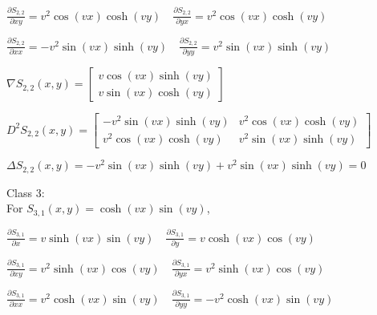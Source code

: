 \documentclass[12pt, executivepaper]{article}
\begin{document}
\begin{flushleft}
\vspace{3mm}

$\frac{\partial S_{2,2}}{\partial xy}=v^2\cos(vx)\cosh(vy) \quad \frac{\partial S_{2,2}}{\partial yx}=v^2\cos(vx)\cosh(vy)$ \\

\vspace{3mm}

$\frac{\partial S_{2,2}}{\partial xx}=-v^2\sin(vx)\sinh(vy) \quad \frac{\partial S_{2,2}}{\partial yy}=v^2\sin(vx)\sinh(vy)$ \\

\vspace{3mm}

$\nabla S_{2,2}(x,y)=
\begin{bmatrix}
v\cos(vx)\sinh(vy) \\
v\sin(vx)\cosh(vy)
\end{bmatrix}$

\vspace{3mm}

$D^2 S_{2,2}(x,y)=
\begin{bmatrix}
-v^2\sin(vx)\sinh(vy) & v^2\cos(vx)\cosh(vy) \\
v^2\cos(vx)\cosh(vy) & v^2\sin(vx)\sinh(vy)
\end{bmatrix}$

\vspace{3mm}

$\Delta S_{2,2}(x,y)=-v^2\sin(vx)\sinh(vy)+v^2\sin(vx)\sinh(vy)=0$

\vspace{5mm}

Class 3: \\

For $S_{3,1}(x,y)=\cosh(vx)\sin(vy)$, \\

\vspace{3mm}

$\frac{\partial S_{3,1}}{\partial x}=v\sinh(vx)\sin(vy) \quad \frac{\partial S_{3,1}}{\partial y}=v\cosh(vx)\cos(vy)$ \\

\vspace{3mm}

$\frac{\partial S_{3,1}}{\partial xy}=v^2\sinh(vx)\cos(vy) \quad \frac{\partial S_{3,1}}{\partial yx}=v^2\sinh(vx)\cos(vy)$ \\

\vspace{3mm}

$\frac{\partial S_{3,1}}{\partial xx}=v^2\cosh(vx)\sin(vy) \quad \frac{\partial S_{3,1}}{\partial yy}=-v^2\cosh(vx)\sin(vy)$ \\


\end{flushleft}
\end{document}
